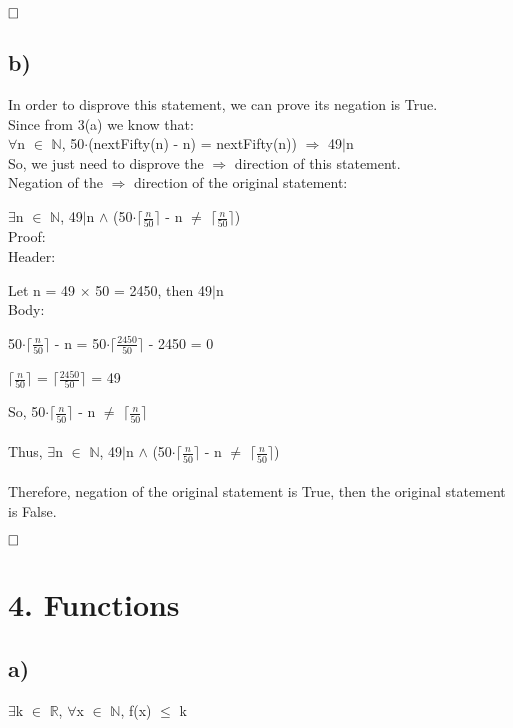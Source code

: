 \documentclass[12pt]{article}
\begin{document}
$\hfill\square$

\vspace{20pt}
\subsection*{b)}
In order to disprove this statement, we can prove its negation is True. \\
Since from 3(a) we know that: \\
$\forall$n $\in$ $\mathbb{N}$, 50$\cdot$(nextFifty(n) - n) = nextFifty(n)) $\Rightarrow$ 49$\mid$n \\
So, we just need to disprove the $\Rightarrow$ direction of this statement. \\
Negation of the $\Rightarrow$ direction of the original statement:

$\exists$n $\in$ $\mathbb{N}$, 49$\mid$n $\wedge$ (50$\cdot$$\lceil$$\frac{n}{50}$$\rceil$ - n $\neq$ $\lceil$$\frac{n}{50}$$\rceil$) \\
Proof:\\
Header:

Let n = 49 $\times$ 50 = 2450, then 49$\mid$n \\
Body: 

50$\cdot$$\lceil$$\frac{n}{50}$$\rceil$ - n = 50$\cdot$$\lceil$$\frac{2450}{50}$$\rceil$ - 2450 = 0

$\lceil$$\frac{n}{50}$$\rceil$ = $\lceil$$\frac{2450}{50}$$\rceil$ = 49

So, 50$\cdot$$\lceil$$\frac{n}{50}$$\rceil$ - n $\neq$ $\lceil$$\frac{n}{50}$$\rceil$ \\
~\\
Thus, $\exists$n $\in$ $\mathbb{N}$, 49$\mid$n $\wedge$ (50$\cdot$$\lceil$$\frac{n}{50}$$\rceil$ - n $\neq$ $\lceil$$\frac{n}{50}$$\rceil$) \\
~\\
Therefore, negation of the original statement is True, then the original statement is False.

$\hfill\square$

\newpage
\section*{4. Functions}
\vspace{20pt}

\subsection*{a)}
$\exists$k $\in$ $\mathbb{R}$, $\forall$x $\in$ $\mathbb{N}$, f(x) $\leq$ k
\end{document}

